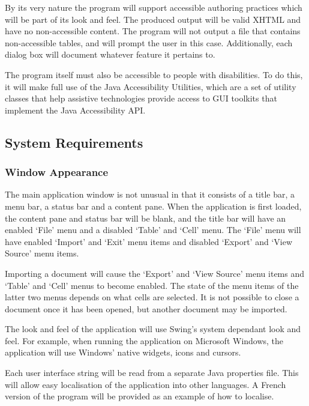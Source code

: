 By its very nature the program will support accessible authoring practices
which will be part of its look and feel. The produced output will be valid
XHTML and have no non-accessible content. The program will not output a file
that contains non-accessible tables, and will prompt the user in this case.
Additionally, each dialog box will document whatever feature it pertains to.

The program itself must also be accessible to people with disabilities. To do
this, it will make full use of the Java Accessibility Utilities, which are a
set of utility classes that help assistive technologies provide access to GUI
toolkits that implement the Java Accessibility API.


\subsection{System Requirements}

\label{sysreqs}

\subsubsection{Window Appearance}

The main application window is not unusual in that it consists of a title bar, a
menu bar, a status bar and a content pane. When the application is first
loaded, the content pane and status bar will be blank, and the title bar will
have an enabled `File' menu and a  disabled `Table' and `Cell' menu. The `File'
menu will have enabled `Import' and `Exit' menu items and disabled `Export' and
`View Source' menu items.

Importing a document will cause the `Export' and `View Source' menu items and
`Table' and `Cell' menus to become enabled. The state of the menu items of the
latter two menus depends on what cells are selected. It is not possible to
close a document once it has been opened, but another document may be imported.

The look and feel of the application will use Swing's system dependant look and
feel. For example, when running the application on Microsoft Windows, the
application will use Windows' native widgets, icons and cursors.

Each user interface string will be read from a separate Java properties file.
This will allow easy localisation of the application into other languages.
A French version of the program will be provided as an example of how to
localise.

